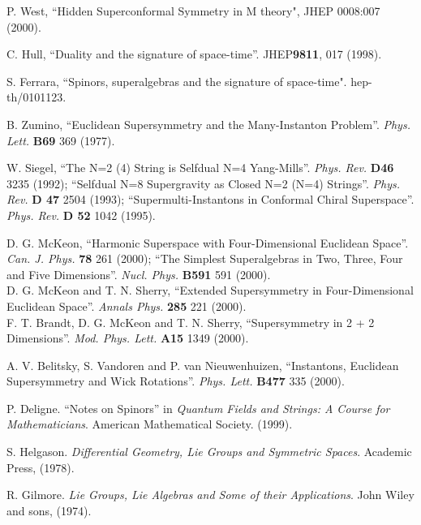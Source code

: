 \documentclass[a4paper,12pt]{article}
\begin{document}
\begin{thebibliography}{99}
 P. West, ``Hidden Superconformal Symmetry in M theory", JHEP 0008:007 (2000).

 C. Hull, ``Duality and the signature of space-time''.
JHEP{\bf 9811}, 017 (1998).

 S. Ferrara, ``Spinors, superalgebras and the signature of
space-time". hep-th/0101123.

B. Zumino, ``Euclidean Supersymmetry and the Many-Instanton
Problem''. {\it  Phys. Lett.} {\bf B69} 369 (1977).

 W. Siegel,
``The N=2 (4) String is Selfdual N=4 Yang-Mills''. {\it Phys.
Rev.} {\bf D46} 3235 (1992); ``Selfdual N=8 Supergravity as Closed
N=2 (N=4) Strings''. {\it Phys.  Rev. } {\bf D 47} 2504 (1993);
``Supermulti-Instantons in Conformal Chiral Superspace''. {\it
Phys.  Rev.} {\bf D 52} 1042 (1995).


D. G. McKeon, ``Harmonic Superspace with Four-Dimensional
Euclidean Space''. {\it  Can.  J.  Phys.} {\bf 78} 261 (2000);
``The Simplest Superalgebras in Two, Three, Four and Five
Dimensions''. {\it  Nucl.  Phys.} {\bf B591} 591 (2000).\\ D. G.
McKeon and T. N. Sherry, ``Extended Supersymmetry in
Four-Dimensional Euclidean Space''.  {\it Annals Phys.}  {\bf 285}
221 (2000). \\F. T. Brandt, D. G. McKeon and T. N. Sherry,
``Supersymmetry in 2 + 2 Dimensions''. {\it  Mod.  Phys.  Lett.}
{\bf A15} 1349 (2000).

 A. V. Belitsky, S. Vandoren and P. van Nieuwenhuizen,
``Instantons, Euclidean Supersymmetry and Wick Rotations''. {\it
Phys.  Lett. } {\bf B477} 335 (2000).


 P. Deligne. ``Notes on Spinors'' in {\it Quantum Fields
and Strings: A Course for Mathematicians}. American Mathematical
Society. (1999).

 S. Helgason. {\it Differential Geometry, Lie Groups and Symmetric Spaces}.
Academic Press, (1978).

 R. Gilmore. {\it Lie Groups, Lie Algebras and Some of their Applications}.
John Wiley and sons, (1974).









\end{thebibliography}
\end{document}
